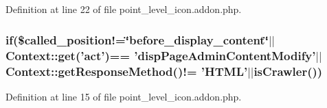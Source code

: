 Definition at line 22 of file point\-\_\-level\-\_\-icon.\-addon.\-php.

\hypertarget{point__level__icon_8addon_8php_a29031816e50a8f742422e671b2bef9b2}{
\subsubsection[{if}]{\setlength{\rightskip}{0pt plus 5cm}if(\$called\-\_\-position!=\char`\"{}before\-\_\-display\-\_\-content\char`\"{}$|$$|$Context\-::get('act')== 'disp\-Page\-Admin\-Content\-Modify'$|$$|${\bf Context\-::get\-Response\-Method}()!= 'H\-T\-M\-L'$|$$|${\bf is\-Crawler}())}}\label{point__level__icon_8addon_8php_a29031816e50a8f742422e671b2bef9b2}


Definition at line 15 of file point\-\_\-level\-\_\-icon.\-addon.\-php.

